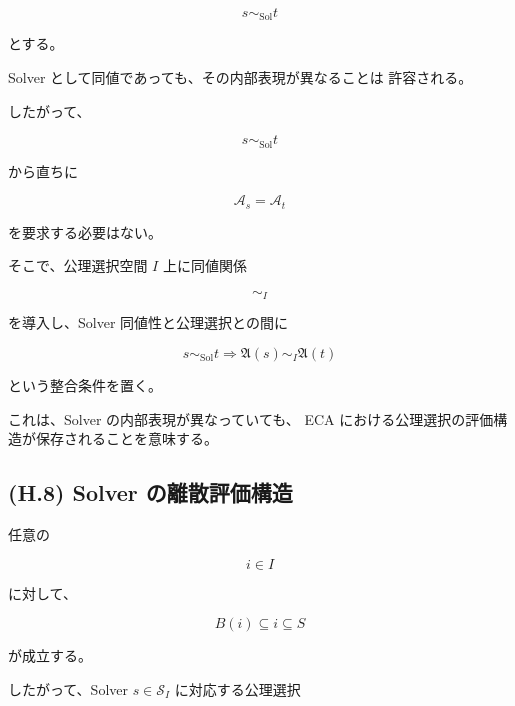 \documentclass[a4paper,11pt]{article}
\begin{document}
\begin{equation}
    s\sim_{\mathrm{Sol}}t
\end{equation}

とする。

Solver として同値であっても、その内部表現が異なることは
許容される。

したがって、

\begin{equation}
    s\sim_{\mathrm{Sol}}t
\end{equation}

から直ちに

\begin{equation}
    \mathcal{A}_s
    =
    \mathcal{A}_t
\end{equation}

を要求する必要はない。

そこで、公理選択空間 $I$ 上に同値関係

\begin{equation}
    \sim_I
\end{equation}

を導入し、Solver 同値性と公理選択との間に

\begin{equation}
    \boxed{
        s\sim_{\mathrm{Sol}}t
        \Longrightarrow
        \mathfrak{A}(s)\sim_I\mathfrak{A}(t)
    }
    \label{eq:H-solver-axiom-equivalence}
\end{equation}

という整合条件を置く。

これは、Solver の内部表現が異なっていても、
ECA における公理選択の評価構造が保存されることを意味する。


\subsection{(H.8) Solver の離散評価構造}
\label{subsec:H8}

任意の

\begin{equation}
    i\in I
\end{equation}

に対して、

\begin{equation}
    B(i)\subseteq i\subseteq S
\end{equation}

が成立する。

したがって、Solver $s\in\mathcal{S}_I$ に対応する公理選択
\end{document}
